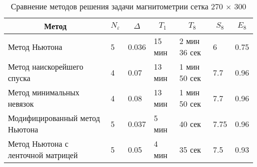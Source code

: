 \begin{table}[H]
	\centering
	\caption{Сравнение методов решения задачи магнитометрии сетка 270 $\times$ 300}
	\label{table3.2}
	\begin{tabular}{|p{}|p{}|l|l|l|l|l|}
		\hline
		\multicolumn{1}{|c|}{Метод}        & \multicolumn{1}{c|}{$N_\varepsilon$} &
		\multicolumn{1}{c|}{$\Delta$} &
		\multicolumn{1}{c|}{$T_1$} & \multicolumn{1}{c|}{$T_8$} &	\multicolumn{1}{c|}{$S_8$}&\multicolumn{1}{c|}{$E_8$} \\ \hline
		Метод Ньютона                      &   5             & 0.036                  &     15 мин                   &      2 мин 36 сек   
		& 6 &        0.75     \\ \hline
		Метод наискорейшего спуска &   4                    & 0.07               & 13 мин    & 1 мин 50 сек & 7.7 & 0.96   \\ \hline
		Метод минимальных невязок &   4                    & 0.08               & 13 мин    & 1 мин 50 сек & 7.7 & 0.96   \\ \hline
		Модифицированный метод Ньютона     &              5           & 0.037           & 5 мин                & 40 сек  & 7.75 & 0.96\\ \hline
		Метод Ньютона с ленточной матрицей &   5                    & 0.05               & 4 мин    & 35 сек & 7.5 & 0.93   \\ \hline
	\end{tabular}
\end{table}

